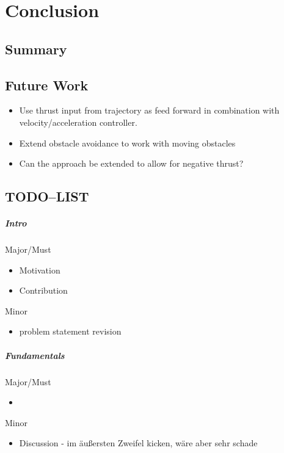 \chapter{Conclusion}\label{chap:conclusion}
\section{Summary}
\section{Future Work}
\begin{itemize}
    \item Use thrust input from trajectory as feed forward in combination with velocity/acceleration controller.
    \item Extend obstacle avoidance to work with moving obstacles
    \item Can the approach be extended to allow for negative thrust?
\end{itemize}


\section{TODO--LIST}

\paragraph{Intro}
Major/Must
\begin{itemize}
    \item Motivation
    \item Contribution
\end{itemize}
Minor
\begin{itemize}
    \item problem statement revision
\end{itemize}

\paragraph{Fundamentals}
Major/Must
\begin{itemize}
    \item 
\end{itemize}
Minor
\begin{itemize}
    \item Discussion - im äußersten Zweifel kicken, wäre aber sehr schade
\end{itemize}


